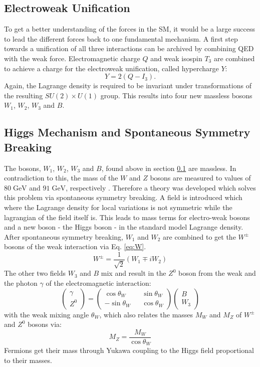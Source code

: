 	\subsection{Electroweak Unification}
	\label{sec:elw}	
	To get a better understanding of the forces in the SM, it would be a large success to lead the different forces back to one fundamental mechanism. A first step towards a unification of all three interactions can be archived by combining QED with the weak force. Electromagnetic charge $Q$ and weak isospin $T_3$ are combined to achieve a charge for the electroweak unification, called hypercharge $Y$:
	\begin{equation}
	Y = 2(Q-I_3).
	\end{equation}
	Again, the Lagrange density is required to be invariant under transformations of the resulting $SU(2) \times U(1)$ group. This results into four new massless bosons $W_1$, $W_2$, $W_3$ and $B$. 
	\subsection{Higgs Mechanism and Spontaneous Symmetry Breaking}
	\label{sec:higgs}
	The bosons, $W_1$, $W_2$, $W_3$ and $B$, found above in section \ref{sec:elw} are massless. In contradiction to this, the mass of the $W$ and $Z$ bosons are measured to values of $80\;\text{GeV}$ and $91\;\text{GeV}$, respectively \cite{pdg2016}. Therefore a theory was developed which solves this problem via spontaneous symmetry breaking. A field is introduced which where the Lagrange density for local variations is not symmetric while the lagrangian of the field itself is. This leads to mass terms for electro-weak bosons and a new boson - the Higgs boson - in the standard model Lagrange density. After spontaneous symmetry breaking, $W_1$ and $W_2$ are combined to get the $W^\pm$ bosons of the weak interaction via Eq. \ref{eq:W}.
	\begin{equation}
	W^\pm = \frac{1}{\sqrt{2}}(W_1 \mp i W_2)
	\label{eq:W}
	\end{equation}
	The other two fields $W_3$ and $B$ mix and result in the $Z^0$ boson from the weak and the photon $\gamma$ of the electromagnetic interaction:
	\begin{equation}
	\begin{pmatrix}\gamma \\ Z^0\end{pmatrix} =
	\begin{pmatrix}
	\cos \theta_W && \sin \theta_W \\
	-\sin \theta_W && \cos \theta_W 
	\end{pmatrix}
	\begin{pmatrix}B \\ W_3\end{pmatrix}
	\label{eq:Z}
	\end{equation}	
	with the weak mixing angle $\theta_W$, which also relates the masses $M_W$ and $M_Z$ of $W^\pm$ and $Z^0$ bosons via:
	\begin{equation}
	M_Z = \frac{M_W}{\cos \theta_W}
	\end{equation}
	Fermions get their mass through Yukawa coupling to the Higgs field proportional to their masses.

